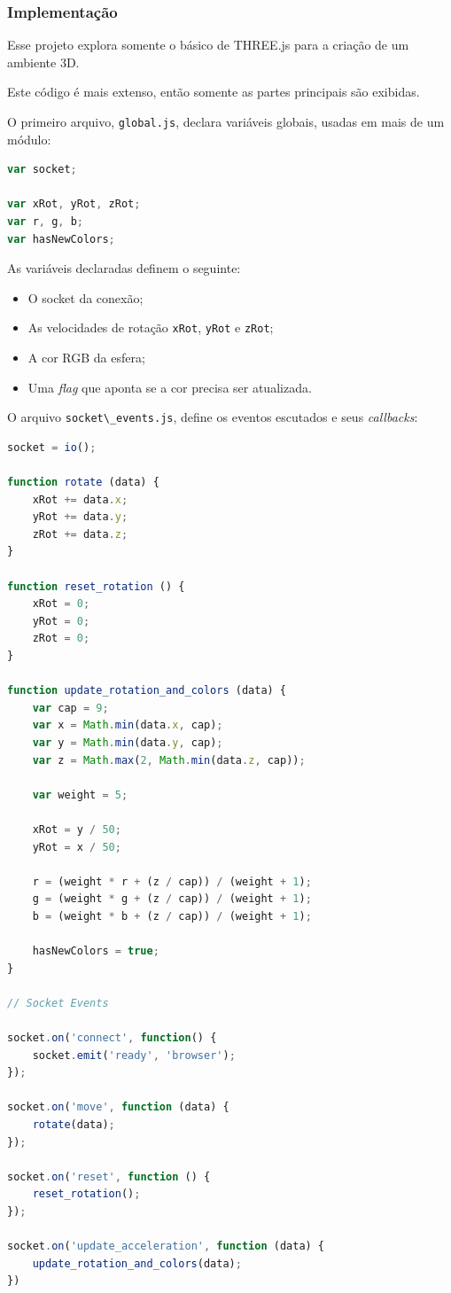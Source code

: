 \documentclass[a4paper,12pt]{article}
\newcommand{\code}[1]{\lstinline[mathescape=true, columns=fixed, basicstyle={\small\ttfamily}]{#1}}
\begin{document}
\subsubsection{Implementação}

Esse projeto explora somente o básico de THREE.js para a criação de um ambiente 3D.

Este código é mais extenso, então somente as partes principais são exibidas.

O primeiro arquivo, \code{global.js}, declara variáveis globais, usadas em mais de um módulo:


\begin{lstlisting}[language=JavaScript]
var socket;

var xRot, yRot, zRot;
var r, g, b;
var hasNewColors;
\end{lstlisting}

As variáveis declaradas definem o seguinte:

\begin{itemize}
  \item O socket da conexão;

  \item As velocidades de rotação \code{xRot}, \code{yRot} e \code{zRot};

  \item A cor RGB da esfera;

  \item Uma \emph{flag} que aponta se a cor precisa ser atualizada.
\end{itemize}


O arquivo \code{socket\_events.js}, define os eventos escutados e seus \emph{callbacks}:


\begin{lstlisting}[language=JavaScript]
socket = io();

function rotate (data) {
    xRot += data.x;
    yRot += data.y;
    zRot += data.z;
}

function reset_rotation () {
    xRot = 0;
    yRot = 0;
    zRot = 0;
}

function update_rotation_and_colors (data) {
    var cap = 9;
    var x = Math.min(data.x, cap);
    var y = Math.min(data.y, cap);
    var z = Math.max(2, Math.min(data.z, cap));

    var weight = 5;

    xRot = y / 50;
    yRot = x / 50;

    r = (weight * r + (z / cap)) / (weight + 1);
    g = (weight * g + (z / cap)) / (weight + 1);
    b = (weight * b + (z / cap)) / (weight + 1);

    hasNewColors = true;
}

// Socket Events

socket.on('connect', function() {
    socket.emit('ready', 'browser');
});

socket.on('move', function (data) {
    rotate(data);
});

socket.on('reset', function () {
    reset_rotation();
});

socket.on('update_acceleration', function (data) {
    update_rotation_and_colors(data);
})
\end{lstlisting}
\end{document}
